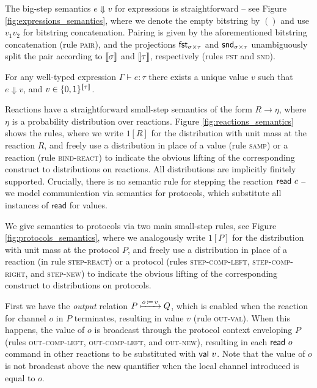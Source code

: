 \noindent The big-step semantics $e \Downarrow v$ for expressions is straightforward -- see Figure \ref{fig:expressions_semantics}, where we denote the empty bitstring by $()$ and use $v_1 v_2$ for bitstring concatenation. Pairing is given by the aforementioned bitstring concatenation (rule \textsc{pair}), and the projections $\mathsf{fst}_{\sigma \times \tau}$ and $\mathsf{snd}_{\sigma \times \tau}$ unambiguously split the pair according to $\llbracket \sigma \rrbracket$ and $\llbracket \tau \rrbracket$, respectively (rules \textsc{fst} and \textsc{snd}).

\begin{lemma}
For any well-typed expression $\Gamma \vdash e : \tau$ there exists a unique value $v$ such that $e \Downarrow v$, and $v \in \{0,1\}^{\llbracket \tau \rrbracket}$.
\end{lemma}

Reactions have a straightforward small-step semantics of the form $R \to \eta$, where $\eta$ is a probability distribution over reactions. Figure \ref{fig:reactions_semantics} shows the rules, where we write $1[R]$ for the distribution with unit mass at the reaction $R$, and freely use a distribution in place of a value (rule \textsc{samp}) or a reaction (rule \textsc{bind-react}) to indicate the obvious lifting of the corresponding construct to distributions on reactions. All distributions are implicitly finitely supported. Crucially, there is no semantic rule for stepping the reaction $\mathsf{read} \ c$ -- we model communication via semantics for protocols, which substitute all instances of $\mathsf{read}$ for values. 

We give semantics to protocols via two main small-step rules, see Figure \ref{fig:protocols_semantics}, where we analogously write $1[P]$ for the distribution with unit mass at the protocol $P$, and freely use a distribution in place of a reaction (in rule \textsc{step-react}) or a protocol (rules \textsc{step-comp-left}, \textsc{step-comp-right}, and \textsc{step-new}) to indicate the obvious lifting of the corresponding construct to distributions on protocols.

First we have the \emph{output} relation $P \xmapsto{o \, \coloneqq \, v} Q$, which is enabled when the reaction for channel $o$ in $P$ terminates, resulting in value $v$ (rule \textsc{out-val}). When this happens, the value of $o$ is broadcast through the protocol context enveloping $P$ (rules \textsc{out-comp-left}, \textsc{out-comp-left}, and \textsc{out-new}), resulting in each $\mathsf{read} \ o$ command in other reactions to be substituted with $\mathsf{val} \ v$. Note that the value of $o$ is not broadcast above the $\mathsf{new}$ quantifier when the local channel introduced is equal to $o$.

